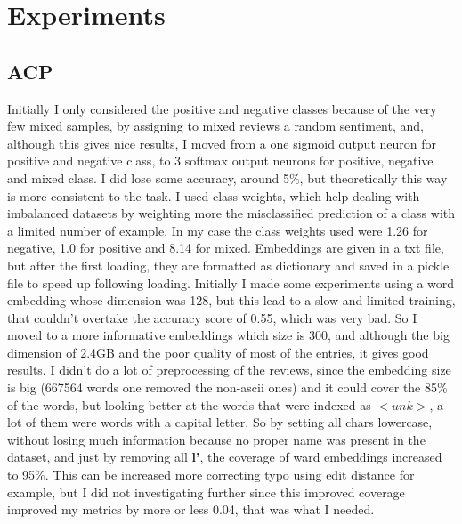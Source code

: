 \documentclass{article}
\begin{document}
    \section{Experiments}\label{sec:s4}
        \subsection{ACP}\label{subsec:s1}
            Initially I only considered the positive and negative classes because of the very few mixed samples, by assigning to mixed reviews a random sentiment, and, although this gives nice results, I moved from a one sigmoid output neuron for positive and negative class, to 3 softmax output neurons for positive, negative and mixed class.
            I did lose some accuracy, around 5\%, but theoretically this way is more consistent to the task.
            I used class weights, which help dealing with imbalanced datasets by weighting more the misclassified prediction of a class with a limited number of example.
            In my case the class weights used were 1.26 for negative, 1.0 for positive and 8.14 for mixed.
            Embeddings are given in a txt file, but after the first loading, they are formatted as dictionary and saved in a pickle file to speed up following loading.
            Initially I made some experiments using a word embedding whose dimension was 128, but this lead to a slow and limited training, that couldn't overtake the accuracy score of 0.55, which was very bad.
            So I moved to a more informative embeddings which size is 300, and although the big dimension of 2.4GB and the poor quality of most of the entries, it gives good results.
            I didn't do a lot of preprocessing of the reviews, since the embedding size is big (667564 words one removed the non-ascii ones) and it could cover the 85\% of the words, but looking better at the words that were indexed as $<unk>$, a lot of them were words with a capital letter.
            So by setting all chars lowercase, without losing much information because no proper name was present in the dataset, and just by removing all \textbf{l'}, the coverage of ward embeddings increased to 95\%.
            This can be increased more correcting typo using edit distance for example, but I did not investigating further since this improved coverage improved my metrics by more or less 0.04, that was what I needed.
\end{document}
